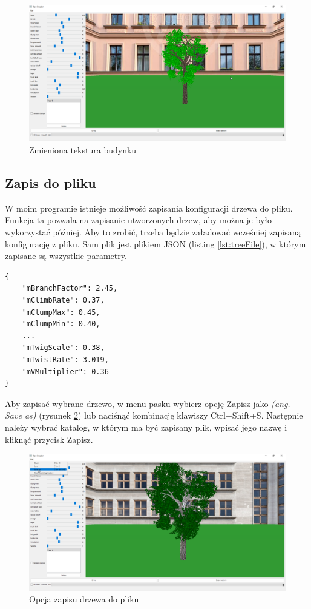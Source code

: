 \documentclass[a4paper,twoside,12pt]{report}
\begin{document}
\begin{figure}[ht]
	\centering\includegraphics[width=15.5cm]{grafika/program/texture5.png}
	\caption{Zmieniona tekstura budynku}
    \label{fig:choosebuild2}
\end{figure}

\subsection{Zapis do pliku}

W moim programie istnieje możliwość zapisania konfiguracji drzewa do pliku. 
Funkcja ta pozwala na zapisanie utworzonych drzew, aby można je było 
wykorzystać później. Aby to zrobić, trzeba będzie 
załadować wcześniej zapisaną konfigurację z pliku.
Sam plik jest plikiem JSON (listing \ref{lst:treeFile}), w którym zapisane są wszystkie parametry.

\begin{lstlisting}[caption={Zawartość pliku drzewa}, label={lst:treeFile}]
{
    "mBranchFactor": 2.45,
    "mClimbRate": 0.37,
    "mClumpMax": 0.45,
    "mClumpMin": 0.40,
	...
    "mTwigScale": 0.38,
    "mTwistRate": 3.019,
    "mVMultiplier": 0.36
}
\end{lstlisting}

Aby zapisać wybrane drzewo, w menu pasku wybierz opcję Zapisz 
jako \textit{(ang. Save as)} (rysunek \ref{fig:saveTree}) lub naciśnąć kombinację klawiszy Ctrl+Shift+S. 
Następnie należy wybrać katalog, w którym ma być zapisany plik, 
wpisać jego nazwę i kliknąć przycisk Zapisz.

\begin{figure}[H]
	\centering\includegraphics[width=15.5cm]{grafika/program/saveTree.png}
	\caption{Opcja zapisu drzewa do pliku}
    \label{fig:saveTree}
\end{figure}
\end{document}
